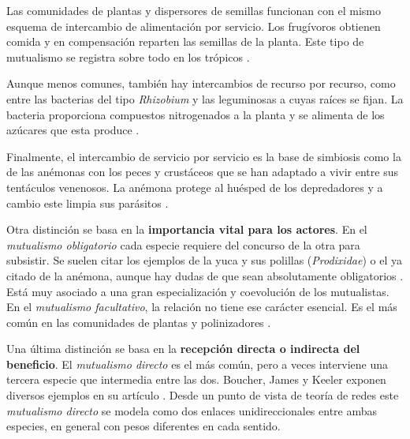 Las comunidades de plantas y dispersores de semillas funcionan con el mismo esquema de intercambio de alimentación por servicio. Los frugívoros obtienen comida y en compensación reparten las semillas de la planta. Este tipo de mutualismo se registra sobre todo en los trópicos \cite{bascompte2007plant, estrada2012frugivores}.
	
Aunque menos comunes, también hay intercambios de recurso por recurso, como entre las bacterias del tipo \textit{Rhizobium} y las leguminosas a cuyas raíces se fijan. La bacteria proporciona compuestos nitrogenados a la planta y se alimenta de los azúcares que esta produce \cite{lindstrom2010biodiversity}.
	
Finalmente, el intercambio de servicio por servicio es la base de simbiosis como la de las anémonas con los peces y crustáceos que se han adaptado a vivir entre sus tentáculos venenosos. La anémona protege al huésped de los depredadores y a cambio este limpia sus parásitos \cite{mebs2009chemical}.

Otra distinción se basa en la \textbf{importancia vital para los actores}. En el \textit{mutualismo obligatorio} cada especie requiere del concurso de la otra para subsistir. Se suelen citar los ejemplos de la yuca y sus polillas (\textit{Prodixidae}) o el ya citado de la anémona, aunque hay dudas de que sean absolutamente obligatorios \cite{briand1982phylogenetic, addicott1995cheating}. Está muy asociado a una gran especialización y coevolución de los mutualistas. En el \textit{mutualismo facultativo}, la relación no tiene ese carácter esencial. Es el más común en las comunidades de plantas y polinizadores \cite{geib2012tracing}.

Una última distinción se basa en la \textbf{recepción directa o indirecta del beneficio}. El \textit{mutualismo directo} es el más común, pero a veces interviene una tercera especie que
intermedia entre las dos. Boucher, James y Keeler exponen diversos ejemplos en su artículo \cite{boucher1982ecology}. Desde un punto de vista de teoría de redes este \textit{mutualismo directo} se modela como dos enlaces unidireccionales entre ambas especies, en general con pesos diferentes en cada sentido.


